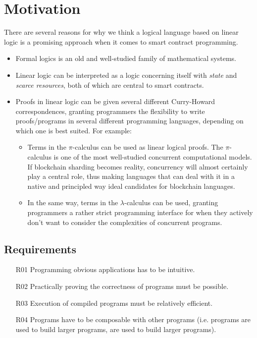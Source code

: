 \documentclass[sigconf]{acmart}
\begin{document}
\section{Motivation}
There are several reasons for why we think a logical language based on linear logic is a promising approach when it comes to smart contract programming.

\begin{itemize}
  \item Formal logics is an old and well-studied family of mathematical systems.
  \item Linear logic can be interpreted as a logic concerning itself with \emph{state} and \emph{scarce resources}, both of which are central to smart contracts.
  \item Proofs in linear logic can be given several different Curry-Howard correspondences, granting programmers the flexibility to write proofs/programs in several different programming languages, depending on which one is best suited. For example:
  \begin{itemize}
  		\item Terms in the $\pi$-calculus can be used as linear logical proofs. The $\pi$-calculus is one of the most well-studied concurrent computational models. If blockchain sharding becomes reality, concurrency will almost certainly play a central role, thus making languages that can deal with it in a native and principled way ideal candidates for blockchain languages.
  		\item In the same way, terms in the $\lambda$-calculus can be used, granting programmers a rather strict programming interface for when they actively don't want to consider the complexities of concurrent programs.
  \end{itemize}
\end{itemize}

\subsection{Requirements}

\begin{enumerate}
  \item[R01] Programming obvious applications has to be intuitive.
  \item[R02] Practically proving the correctness of programs must be possible.
  \item[R03] Execution of compiled programs must be relatively efficient.
  \item[R04] Programs have to be composable with other programs (i.e. programs are used to build larger programs, are used to build larger programs).
\end{enumerate}
\end{document}
